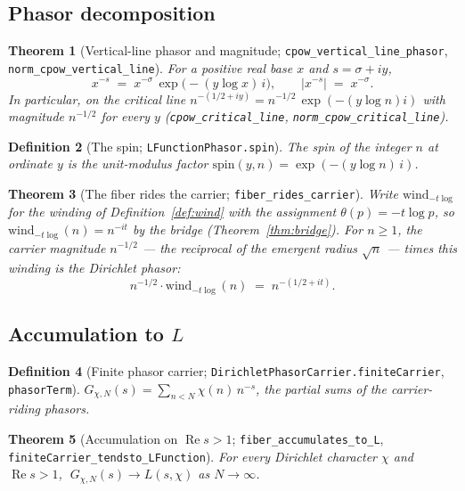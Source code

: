 \documentclass[11pt]{article}
\newtheorem{definition}{Definition}[section]
\newtheorem{theorem}[definition]{Theorem}
\DeclareMathOperator{\Ree}{Re}
\newcommand{\code}[1]{\texttt{#1}}
\begin{document}
\subsection{Phasor decomposition}

\begin{theorem}[Vertical-line phasor and magnitude; \code{cpow\_vertical\_line\_phasor}, \code{norm\_cpow\_vertical\_line}]\label{thm:phasor}
For a positive real base $x$ and $s=\sigma+iy$,
\[
  x^{-s} \;=\; x^{-\sigma}\,\exp\!\bigl(-(y\log x)\,i\bigr),\qquad
  \bigl|x^{-s}\bigr| \;=\; x^{-\sigma}.
\]
In particular, on the critical line $n^{-(1/2+iy)}=n^{-1/2}\,\exp(-(y\log n)i)$ with magnitude
$n^{-1/2}$ for every $y$ (\code{cpow\_critical\_line}, \code{norm\_cpow\_critical\_line}).
\end{theorem}

\begin{definition}[The spin; \code{LFunctionPhasor.spin}]\label{def:spin}
The \emph{spin} of the integer $n$ at ordinate $y$ is the unit-modulus factor
$\mathrm{spin}(y,n)=\exp(-(y\log n)\,i)$.
\end{definition}

\begin{theorem}[The fiber rides the carrier; \code{fiber\_rides\_carrier}]\label{thm:rides}
Write $\mathrm{wind}_{-t\log}$ for the winding of Definition~\ref{def:wind} with the assignment
$\theta(p)=-t\log p$, so $\mathrm{wind}_{-t\log}(n)=n^{-it}$ by the bridge (Theorem~\ref{thm:bridge}).
For $n\ge 1$, the carrier magnitude $n^{-1/2}$ --- the reciprocal of the emergent radius $\sqrt n$ ---
times this winding is the Dirichlet phasor:
\[
  n^{-1/2}\cdot\mathrm{wind}_{-t\log}(n) \;=\; n^{-(1/2+it)} .
\]
\end{theorem}

\subsection{Accumulation to $L$}

\begin{definition}[Finite phasor carrier; \code{DirichletPhasorCarrier.finiteCarrier}, \code{phasorTerm}]\label{def:finite}
$G_{\chi,N}(s)=\sum_{n<N}\chi(n)\,n^{-s}$, the partial sums of the carrier-riding phasors.
\end{definition}

\begin{theorem}[Accumulation on $\Ree s>1$; \code{fiber\_accumulates\_to\_L}, \code{finiteCarrier\_tendsto\_LFunction}]\label{thm:accum}
For every Dirichlet character $\chi$ and $\Ree s>1$, $\;G_{\chi,N}(s)\to L(s,\chi)$ as $N\to\infty$.
\end{theorem}
\end{document}
